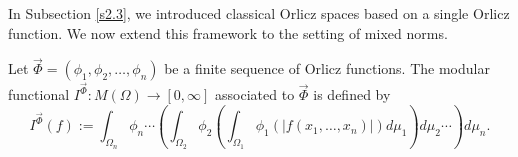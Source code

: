 \documentclass[11pt, a4paper]{article}
\theoremstyle{definition}
\numberwithin{equation}{section}
\def\NN{\mathbb N}
\newcommand{\vc}[1]{\overrightarrow{#1}}
\begin{document}
In Subsection \ref{s2.3}, we introduced classical Orlicz spaces based on a single Orlicz function. We now extend this framework to the setting of mixed norms.

Let $\vc{\Phi}=(\phi_1,\phi_2,\dots,\phi_n)$ be a finite sequence of Orlicz functions. The modular functional $I^{\vc{\Phi}}: M(\Omega) \to [0,\infty]$ associated to $\vc{\Phi}$ is defined by 
\begin{equation*} \label{2.2}
    I^{\overrightarrow{\Phi}}(f):=\int_{\Omega_n} \phi_{n}\cdots \left( \int_{\Omega_2}\phi_{2} \left( \int_{\Omega_1} \phi_1 \left( |f(x_1,\dots,x_n)| \right)d\mu_1\right)d\mu_{2}\cdots \right)d\mu_n.
\end{equation*}

\end{document}
